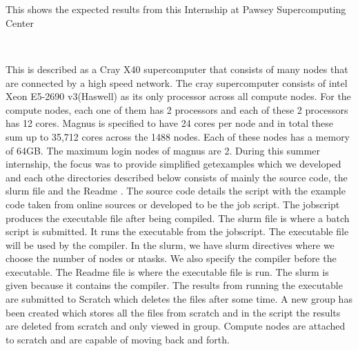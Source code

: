 \begin{Document}

\begin{abstract}




\end{abstract}
\\
\begin{Intro}




\end{Intro}
\
\
\\
\begin{scope}

This shows the expected results from this Internship at Pawsey Supercomputing Center
\
\



\end{scope}
\
\\

This is described as a Cray X40 supercomputer that consists of many nodes that are connected by a high speed network. The cray supercomputer consists of intel Xeon E5-2690 v3(Haswell) as its only processor across all compute nodes. For the compute nodes, each one of them has 2 processors and each of these 2 processors has 12 cores.
Magnus is specified to have 24 cores per node and in total these sum up to 35,712 cores across the 1488 nodes. Each of these nodes has a memory of 64GB. The maximum login nodes of magnus are 2.
During this summer internship, the focus was to provide simplified getexamples which we developed and each othe directories described below consists of mainly the source code, the slurm file and the Readme . The source code details the script with the example code taken from online sources or developed to be the job script. The jobscript produces the executable file after being compiled. The slurm file is where a batch script is submitted. It runs the executable from the jobscript. The executable file will be used by the compiler. In the slurm, we have slurm directives where we choose the number of nodes or ntasks. We also specify the compiler before the executable. The Readme file is where the executable file is run. The slurm is given because it contains the compiler. The results from running the executable are submitted to Scratch which deletes the files after some time. A new group has been created which stores all the files from scratch and in the script the results are deleted from scratch and only viewed in group. Compute nodes are attached to scratch and are capable of moving back and forth.


\end{Document}
